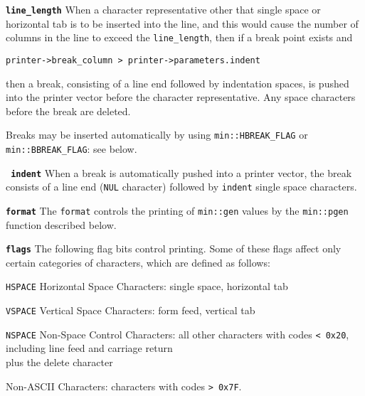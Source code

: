\documentclass[12pt]{article}
\makeatletter
\newcommand{\ttmkey}[2]{{\tt \bf #1}\index{#1@{\tt #1}!#2}}
\newcommand{\ttnbmkey}[2]{{\tt #1}\index{#1@{\tt #1}!#2}}
\newcommand{\EOL}{\penalty \exhyphenpenalty}
\newenvironment{itemlist}[1][1.2in]%
	{\begin{list}{}{\setlength{\labelwidth}{#1}%
		        \setlength{\leftmargin}{\labelwidth}%
		        \addtolength{\leftmargin}{+0.2in}%
		        \renewcommand{\makelabel}[1]{##1\hfill}}}%
	{\end{list}}
\makeatother
\begin{document}
\begin{itemlist}

\item[\ttmkey{line\_length}{in {\tt min::printer\_parameters}}]
When a character representative other that single space or horizontal
tab is to be inserted into the line, and this would cause the number
of columns in the line to exceed the {\tt line\_length}, then if a
break point exists and
\begin{center}
\verb|printer->break_column > printer->parameters.indent|
\end{center}
then a break, consisting of a line end followed by indentation spaces,
is pushed into the printer vector before the character representative.
Any space characters before the break are deleted.

Breaks may be inserted automatically by using
{\tt min::\EOL HBREAK\_\EOL FLAG} or
{\tt min::\EOL BBREAK\_\EOL FLAG}: see below.

\item[\ttmkey{ indent}{in {\tt min::printer\_parameters}}]
When a break is automatically pushed into a printer vector, the
break consists of a line end ({\tt NUL} character) followed by
{\tt indent} single space characters.

\item[\ttmkey{format}{in {\tt min::printer\_parameters}}]
The {\tt format}
controls the printing of
{\tt min::gen} values by the {\tt min::pgen} function described
below.

\item[\ttmkey{flags}{in {\tt min::printer\_parameters}}]
The following flag bits control printing.  Some of these
flags affect only certain categories of characters, which are
defined as follows:

\begin{itemlist}[0.8in]
\item[\ttnbmkey{HSPACE}{character category}]
    Horizontal Space Characters: single space, horizontal tab
\item[\ttnbmkey{VSPACE}{character category}]
    Vertical Space Characters: form feed, vertical tab
\item[\ttnbmkey{NSPACE}{character category}]
    Non-Space Control Characters: all other characters
with codes {\tt < 0x20}, including line feed and carriage return \\
plus the delete character
\item[] Non-ASCII Characters: characters
with codes {\tt > 0x7F}.
\end{itemlist}

\end{itemlist}
\end{document}
